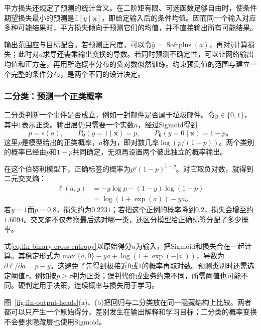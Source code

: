 平方损失还规定了预测的统计含义。在二阶矩有限、可选函数足够自由时，使条件期望损失最小的预测是$\mathbb{E}[y\mid\bm{x}]$，即给定输入后的条件均值。因而同一个输入对应多种可能结果时，平方损失倾向于预测它们的均值，并不直接输出所有可能结果。

输出范围应与目标配合。若预测正尺度，可以令$\widehat y=\operatorname{Softplus}(a)$，再对$\widehat y$计算损失；此时对$a$求导还需乘输出变换的导数。若同时预测不确定性，可以让网络输出均值和正方差，再用所选概率分布的负对数似然训练。约束预测值的范围与建立一个完整的条件分布，是两个不同的设计决定。

\subsubsection{二分类：预测一个正类概率}
\label{sec:ffn-output-binary}

二分类判断一个事件是否成立，例如一封邮件是否属于垃圾邮件。令$y\in\{0,1\}$，其中$1$表示正类。输出层仍只需要一个实数$a$，经过Sigmoid得到
\[
  p=s(a),\qquad P_{\bm{\theta}}(y=1\mid\bm{x})=p,
  \qquad P_{\bm{\theta}}(y=0\mid\bm{x})=1-p\text{。}
\]
这里$p$是模型给出的正类概率，$a$称为，即对数几率$\log(p/(1-p))$。两个类别的概率已经由$p$和$1-p$共同确定，无须再设置两个彼此独立的概率输出。

在这个伯努利模型下，正确标签的概率为$p^y(1-p)^{1-y}$。对它取负对数，就得到二元交叉熵：
\begin{equation}
  \begin{aligned}
    \ell(a,y)
      &=-y\log p-(1-y)\log(1-p)\\
      &=\log(1+\exp(a))-ya\text{。}
  \end{aligned}
  \label{eq:ffn-binary-cross-entropy}
\end{equation}
若$y=1$而$p=0.8$，损失约为$0.2231$；若把这个正例的概率降到$0.2$，损失会增至约$1.6094$。交叉熵不仅考察最后选对哪一类，还区分模型给正确标签分配了多少概率。

式\eqref{eq:ffn-binary-cross-entropy}以原始得分$a$为输入，把Sigmoid和损失合在一起计算。其稳定形式为$\max\{a,0\}-ya+\log(1+\exp(-|a|))$，导数为$\partial\ell/\partial a=p-y$。这避免了先得到极接近$0$或$1$的概率再取对数。预测类别时还需选定阈值$\tau$，例如按$p\geq\tau$判为正类；误判代价或业务约束不同，所需阈值也可能不同。硬判定用于决策，连续概率与损失用于学习。

图~\ref{fig:ffn-output-heads}(a)、(b)把回归与二分类放在同一隐藏结构上比较。两者都可以只产生一个原始得分，差别发生在输出解释和学习目标；二分类的概率变换不会要求隐藏层也使用Sigmoid。


